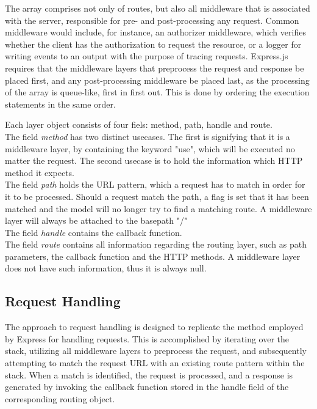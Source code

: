 The array comprises not only of routes, but also all middleware that is associated with the server, responsible for pre- and post-processing any request. Common middleware would include, for instance, an authorizer middleware, which verifies whether the client has the authorization to request the resource, or a logger for writing events to an output with the purpose of tracing requests.
Express.js requires that the middleware layers that preprocess the request and response be placed first, and any post-processing middleware be placed last, as the processing of the array is queue-like, first in first out. This is done by ordering the execution statements in the same order.

Each layer object consists of four fiels: method, path, handle and route.\\
The field \textit{method} has two distinct usecases. The first is signifying that it is a middleware layer, by containing the keyword "use", which will be executed no matter the request.
The second usecase is to hold the information which HTTP method it expects. \\
The field \textit{path} holds the URL pattern, which a request has to match in order for it to be processed. Should a request match the path, a flag is set that it has been matched and the model will no longer try to find a matching route. A middleware layer will always be attached to the basepath "/"\\
The field \textit{handle} contains the callback function.\\
The field \textit{route} contains all information regarding the routing layer, such as path parameters, the callback function and the HTTP methods. A middleware layer does not have such information, thus it is always null.




\subsection{Request Handling}
\label{sec:req-handling}
The approach to request handling is designed to replicate the method employed by Express for handling requests. This is accomplished by iterating over the stack, utilizing all middleware layers to preprocess the request, and subsequently attempting to match the request URL with an existing route pattern within the stack. When a match is identified, the request is processed, and a response is generated by invoking the callback function stored in the handle field of the corresponding routing object.

